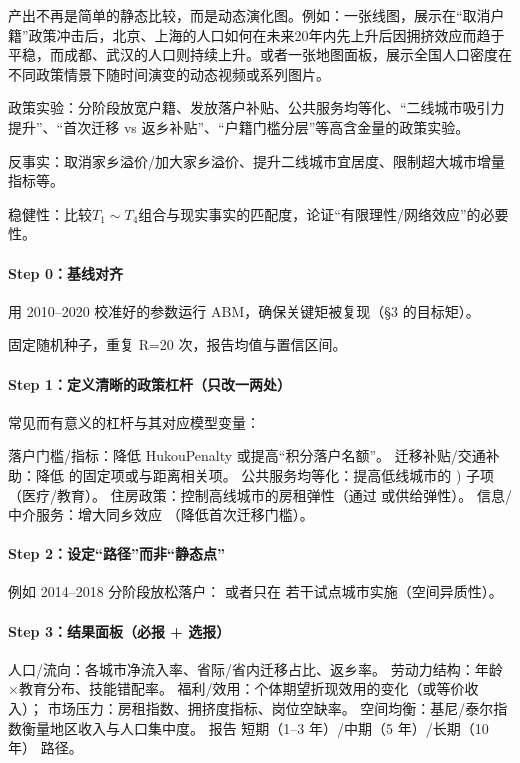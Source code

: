 \documentclass[
  a4paper,
  zihao=-4,
  fontset=mac,
  AutoFakeBold,
  AutoFakeSlant,
  oneside]{ctexbook}
\begin{document}
产出不再是简单的静态比较，而是动态演化图。例如：一张线图，展示在“取消户籍”政策冲击后，北京、上海的人口如何在未来20年内先上升后因拥挤效应而趋于平稳，而成都、武汉的人口则持续上升。或者一张地图面板，展示全国人口密度在不同政策情景下随时间演变的动态视频或系列图片。



政策实验：分阶段放宽户籍、发放落户补贴、公共服务均等化、“二线城市吸引力提升”、“首次迁移 vs 返乡补贴”、“户籍门槛分层”等高含金量的政策实验。

反事实：取消家乡溢价/加大家乡溢价、提升二线城市宜居度、限制超大城市增量指标等。

稳健性：比较$T_1\sim T_4$组合与现实事实的匹配度，论证“有限理性/网络效应”的必要性。



\paragraph{Step 0：基线对齐}

用 2010–2020 校准好的参数运行 ABM，确保关键矩被复现（§3 的目标矩）。

固定随机种子，重复 
R=20 次，报告均值与置信区间。

\paragraph{Step 1：定义清晰的政策杠杆（只改一两处）}

常见而有意义的杠杆与其对应模型变量：

落户门槛/指标：降低 
HukouPenalty 或提高“积分落户名额”。
迁移补贴/交通补助：降低 
的固定项或与距离相关项。
公共服务均等化：提高低线城市的 ) 子项（医疗/教育）。
住房政策：控制高线城市的房租弹性（通过  或供给弹性）。
信息/中介服务：增大同乡效应 （降低首次迁移门槛）。

\paragraph{Step 2：设定“路径”而非“静态点”}

例如 2014–2018 分阶段放松落户：
或者只在 若干试点城市实施（空间异质性）。

\paragraph{Step 3：结果面板（必报 + 选报）}

人口/流向：各城市净流入率、省际/省内迁移占比、返乡率。
劳动力结构：年龄×教育分布、技能错配率。
福利/效用：个体期望折现效用的变化（或等价收入）；
市场压力：房租指数、拥挤度指标、岗位空缺率。
空间均衡：基尼/泰尔指数衡量地区收入与人口集中度。
报告 短期（1–3 年）/中期（5 年）/长期（10 年） 路径。
\end{document}
